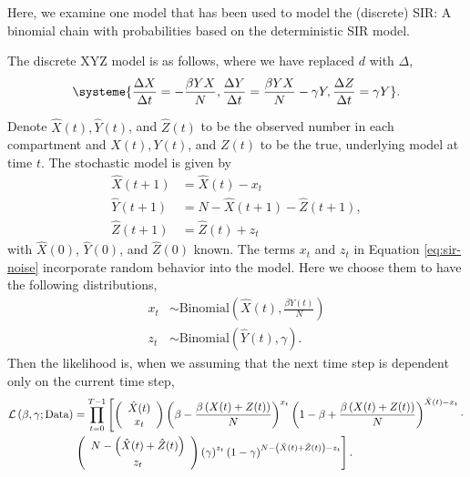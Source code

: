 \documentclass[12pt]{article}
\begin{document}
Here, we examine one model that has been used to model the (discrete) SIR: A binomial chain with probabilities based on the deterministic SIR model.


The discrete XYZ model is as follows, where we have replaced $d$ with $\Delta$,
\begin{align*}
\systeme{\frac{\Delta X}{\Delta t} = -\frac{\beta Y X}{N}, \frac{\Delta Y}{\Delta t} = \frac{\beta Y X}{N} - \gamma Y, \frac{\Delta Z}{\Delta t} = \gamma Y}. 
\end{align*}

Denote $\hat{X}(t), \hat{Y}(t)$, and $\hat{Z}(t)$ to be the observed number in each compartment and $X(t), Y(t)$, and $Z(t)$ to be the true, underlying model at time $t$.   The stochastic model is given by
\begin{align*}
  \hat{X}(t+1) &= \hat{X}(t) - x_t\\
  \hat{Y}(t+1) & = N - \hat{X}(t+1) - \hat{Z}(t+1), \nonumber \\
  \hat{Z}(t+1) &= \hat{Z}(t) + z_t \nonumber
\end{align*}
with $\hat{X}(0)$, $\hat{Y}(0)$, and $\hat{Z}(0)$ known. The terms $x_t$ and $z_t$ in Equation \eqref{eq:sir-noise} incorporate random behavior into the model.  Here we choose them to have the following distributions,
\begin{align*}
  x_{t} &\sim \text{Binomial}\left (\hat{X}(t), \frac{\beta Y(t)}{N} \right ) \\
  z_{t} &\sim \text{Binomial}\left (\hat{Y}(t), \gamma \right ). \nonumber
\end{align*}
Then the likelihood is, when we assuming that the next time step is dependent only on the current time step,
\begin{align*}
  \mathcal{L}\left (\beta, \gamma ; \textnormal{Data} \right ) &=
                                                  \prod_{t=0}^{T-1} \left [\left ( \begin{array}{c}
                                                            \hat{X}(t) \\
                                                            x_t
                                                            \end{array}
  \right ) \left (\beta - \frac{\beta\left (X(t) +Z(t) \right )}{N} \right )^{x_t} \left (1 - \beta +  \frac{\beta\left (X(t) + Z(t) \right )}{N} \right )^{\hat{X}(t) - x_t} \cdot \right .\\
  & \left . \left ( \begin{array}{c}
              N -\left ( \hat{X}(t) + \hat{Z}(t)\right ) \\
              z_t
            \end{array}
  \right ) \left (\gamma \right )^{z_t} \left ( 1 - \gamma\right )^{N -\left ( \hat{X}(t) + \hat{Z}(t)\right ) - z_t} \right ].
\end{align*}
\end{document}
